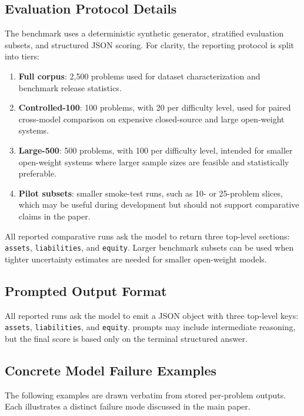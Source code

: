 \subsection{Evaluation Protocol Details}

The benchmark uses a deterministic synthetic generator, stratified
evaluation subsets, and structured JSON scoring.
For clarity, the reporting protocol is split into tiers:
\begin{enumerate}[leftmargin=*,topsep=2pt,itemsep=2pt]
\item \textbf{Full corpus}: 2{,}500 problems used for dataset
  characterization and benchmark release statistics.
\item \textbf{Controlled-100}: 100 problems, with 20 per difficulty
  level, used for paired cross-model comparison on expensive closed-source
  and large open-weight systems.
\item \textbf{Large-500}: 500 problems, with 100 per difficulty level,
  intended for smaller open-weight systems where larger sample sizes are
  feasible and statistically preferable.
\item \textbf{Pilot subsets}: smaller smoke-test runs, such as
  10- or 25-problem slices, which may be useful during development but
  should not support comparative claims in the paper.
\end{enumerate}

All reported comparative runs ask the model to return three top-level
sections: \texttt{assets}, \texttt{liabilities}, and \texttt{equity}.
Larger benchmark subsets can be used when tighter uncertainty estimates
are needed for smaller open-weight models.

\subsection{Prompted Output Format}

All reported runs ask the model to emit a JSON object with three top-level keys:
\texttt{assets}, \texttt{liabilities}, and \texttt{equity}.
\CoT{} prompts may include intermediate reasoning, but the final score is based only on the terminal structured answer.

\subsection{Concrete Model Failure Examples}
\label{app:failure-examples}

The following examples are drawn verbatim from stored per-problem
outputs.  Each illustrates a distinct failure mode discussed in the
main paper.

